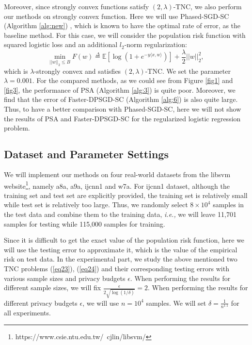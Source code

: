 \documentclass[12pt]{alt2022} %
\begin{document}
 Moreover, since strongly convex functions satisfy $(2,\lambda)$-TNC, we also perform our methods on strongly convex function. Here we will use Phased-SGD-SC (Algorithm \ref{alg:new}) \citep{feldman2020private}, which is known to have the optimal rate of error, as the baseline method. For this case, we will consider  the population risk function with squared logistic loss  and an additional  $l_2$-norm regularization: 
  \begin{equation}\label{eq24}
 \min \limits_{||w||_2\leq B}F(w)\overset{\Delta}{=} \mathbb{E}[\log (1+e^{-y\langle x, w\rangle})]+\frac{\lambda}{2}||w||^2_2, 
 \end{equation}
 which is $\lambda$-strongly convex and satisfies $(2,\lambda)$-TNC. We set the parameter $\lambda=0.001$. For the compared methods, as we could see from Figure \ref{fig1} and \ref{fig3}, the performance of PSA (Algorithm \ref{alg:3}) is quite poor. Moreover, we find that the error of Faster-DPSGD-SC (Algorithm \ref{alg:6}) is also quite large. Thus, to have a better comparison with Phased-SGD-SC, here we will not show the results of PSA  and Faster-DPSGD-SC for the regularized logistic regression problem.  
 
 
 \subsection*{Dataset and Parameter Settings}
 We will implement our methods on four real-world datasets from the libsvm website\footnote{https://www.csie.ntu.edu.tw/~cjlin/libsvm/}, namely a8a, a9a, ijcnn1 and w7a. For ijcnn1 dataset, although the training set and test set are explicitly provided, the training set is relatively small while test set is relatively too large. Thus, we randomly select $8\times 10^4$ samples in the test data and combine them to the training data, {\em i.e.,} we will leave 11,701 samples for testing while 115,000 samples for training.
 
Since it is difficult to get the exact value of the population risk function, here we will use the testing error to approximate it, which is the value of the empirical risk on test data. In the experimental part, we study the above mentioned two TNC problems (\ref{eq23}), (\ref{eq24}) and their corresponding testing errors with various sample sizes and privacy budgets $\epsilon$. When performing the results for different sample sizes, we will fix $\frac{\epsilon}{2\sqrt{\log(1/\delta)}}=2$. When performing the results for different privacy budgets $\epsilon$, we will use $n=10^4$ samples. We will set $\delta=\frac{1}{n^{1.1}}$ for all experiments. 
\end{document}

